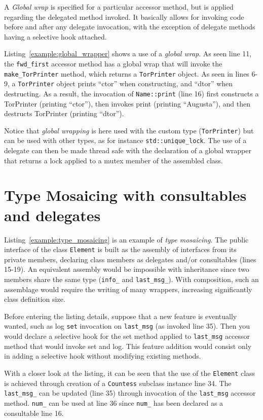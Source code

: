 \documentclass{article}
\begin{document}
A \textit{Global wrap} is specified for a particular accessor method, but is applied regarding the delegated method invoked. It basically allows for invoking code before and after any delegate invocation, with the exception of delegate methods having a selective hook attached.

Listing~\ref{example:global_wrapper} shows a use of a \textit{global wrap}. As seen line 11, the \texttt{fwd\_first} accessor method has a global wrap that will invoke the \texttt{make\_TorPrinter} method, which returns a \texttt{TorPrinter} object. As seen in lines 6-9, a \texttt{TorPrinter} object prints ``ctor'' when constructing, and ``dtor'' when destructing. As a result, the invocation of \texttt{Name::print} (line 16) first constructs a TorPrinter (printing ``ctor''), then invokes print (printing ``Augusta''), and then destructs TorPrinter (printing ``dtor''). 

Notice that \textit{global wrapping} is here used with the custom type (\texttt{TorPrinter}) but can be used with other types, as for instance \texttt{std::unique\_lock}. The use of a delegate can then be made thread safe with the declaration of a global wrapper that returns a lock applied to a mutex member of the assembled class.


\section{Type Mosaicing with consultables and delegates}
Listing~\ref{example:type_mosaicing} is an example of \textit{type mosaicing}. The public interface of the class \texttt{Element} is built as the assembly of interfaces from its private members, declaring class members as delegates and/or consultables (lines 15-19). An equivalent assembly would be impossible with inheritance since two members share the same type (\texttt{info\_} and \texttt{last\_msg\_}). With composition, such an assemblage would require the writing of many wrappers, increasing significantly class definition size. 

Before entering the listing details, suppose that a new feature is eventually wanted, such as log \texttt{set} invocation on \texttt{last\_msg} (as invoked line 35). Then you would declare a selective hook for the set method applied to \texttt{last\_msg} accessor method that would invoke set and log. This feature addition would consist only in adding a selective hook without modifying existing methods.   

With a closer look at the listing, it can be seen that the use of the \texttt{Element} class is achieved through creation of a \texttt{Countess} subclass instance line 34. The \texttt{last\_msg\_} can be updated (line 35) through invocation of the \texttt{last\_msg} accessor method. \texttt{num\_} can be used at line 36 since \texttt{num\_} has been declared as a consultable line 16.       
\end{document}
